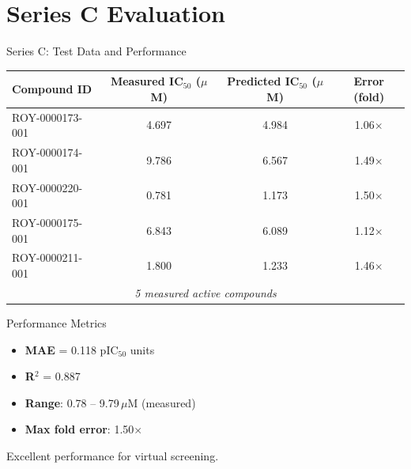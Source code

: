 \documentclass[aspectratio=169]{beamer}
\begin{document}
\section{Series C Evaluation}

\begin{frame}{Series C: Test Data and Performance}
  \centering
  \small
  \begin{tabular}{lccc}
    \toprule
    \textbf{Compound ID} & \textbf{Measured IC$_{50}$ ($\mu$M)} & \textbf{Predicted IC$_{50}$ ($\mu$M)} & \textbf{Error (fold)} \\
    \midrule
    ROY-0000173-001 & 4.697 & 4.984 & 1.06$\times$ \\
    ROY-0000174-001 & 9.786 & 6.567 & 1.49$\times$ \\
    ROY-0000220-001 & 0.781 & 1.173 & 1.50$\times$ \\
    ROY-0000175-001 & 6.843 & 6.089 & 1.12$\times$ \\
    ROY-0000211-001 & 1.800 & 1.233 & 1.46$\times$ \\
    \midrule
    \multicolumn{4}{c}{\textit{5 measured active compounds}} \\
    \bottomrule
  \end{tabular}

  \vspace{1.0em}
  \begin{block}{Performance Metrics}
    \large
    \begin{itemize}
      \item \textbf{MAE} = 0.118 pIC$_{50}$ units
      \item \textbf{R$^2$} = 0.887
      \item \textbf{Range}: 0.78 -- 9.79\,$\mu$M (measured)
      \item \textbf{Max fold error}: 1.50$\times$
    \end{itemize}
  \end{block}
  \vspace{0.5em}
  {\small Excellent performance for virtual screening.}
\end{frame}
\end{document}
